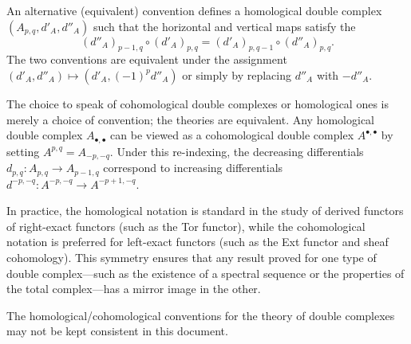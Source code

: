 \begin{definition}
\begin{enumerate}
    \begin{center}
    \end{center}
    
    An alternative (equivalent) convention defines a homological double complex $(A_{p,q}, d'_A, d''_A)$ such that the horizontal and vertical maps satisfy the 
    $$ (d''_A)_{p-1,q} \circ (d'_A)_{p,q} = (d'_A)_{p,q-1} \circ (d''_A)_{p,q}. $$
    The two conventions are equivalent under the assignment $(d'_A, d''_A) \mapsto (d'_A, (-1)^p d''_A)$ or simply by replacing $d''_A$ with $-d''_A$.
\end{enumerate}

The choice to speak of cohomological double complexes or homological ones is merely a choice of convention; the theories are equivalent. Any homological double complex $A_{\bullet,\bullet}$ can be viewed as a cohomological double complex $A^{\bullet,\bullet}$ by setting $A^{p,q} = A_{-p,-q}$. Under this re-indexing, the decreasing differentials $d_{p,q} : A_{p,q} \to A_{p-1,q}$ correspond to increasing differentials $d^{-p,-q} : A^{-p,-q} \to A^{-p+1,-q}$. 

In practice, the homological notation is standard in the study of derived functors of right-exact functors (such as the Tor functor), while the cohomological notation is preferred for left-exact functors (such as the Ext functor and sheaf cohomology). This symmetry ensures that any result proved for one type of double complex—such as the existence of a spectral sequence or the properties of the total complex—has a mirror image in the other.
\end{definition}


\begin{remark}
    The homological/cohomological conventions for the theory of double complexes may not be kept consistent in this document. 
\end{remark}